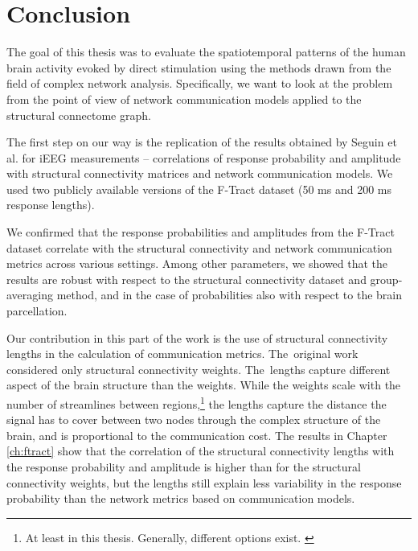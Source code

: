 \chapter*{Conclusion}

The goal of this thesis was to evaluate the spatiotemporal patterns of the human brain activity evoked by direct stimulation using the methods drawn from the field of complex network analysis. Specifically, we want to look at the problem from the point of view of network communication models applied to the structural connectome graph. 

The first step on our way is the replication of the results obtained by Seguin et al. \cite{seguin_communication_2023} for iEEG measurements -- correlations of response probability and amplitude with structural connectivity matrices and network communication models. We used two publicly available versions of the F-Tract dataset (50 ms and 200 ms response lengths).

We confirmed that the response probabilities and amplitudes from the F-Tract dataset correlate with the structural connectivity and network communication metrics across various settings. Among other parameters, we showed that the results are robust with respect to the structural connectivity dataset and group-averaging method, and in the case of probabilities also with respect to the brain parcellation. 

Our contribution in this part of the work is the use of structural connectivity lengths in the calculation of communication metrics. The~original work considered only structural connectivity weights. The~lengths capture different aspect of the brain structure than the weights. While the weights scale with the number of streamlines between regions,\footnote{At least in this thesis. Generally, different options exist. \cite{zhang_quantitative_2022}} the lengths capture the distance the signal has to cover between two nodes through the complex structure of the brain, and is proportional to the communication cost. The results in Chapter \ref{ch:ftract} show that the correlation of the structural connectivity lengths with the response probability and amplitude is higher than for the structural connectivity weights, but the lengths still explain less variability in the response probability than the network metrics based on communication models.

